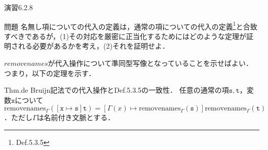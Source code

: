 \documentclass[9pt]{beamer}
\begin{document}
\begin{frame}{演習6.2.8}
\begin{alertblock}{問題}
名無し項についての代入の定義は，通常の項についての代入の定義\footnote{Def.5.3.5}と合致すべきであるが，(1)その対応を厳密に正当化するためにはどのような定理が証明される必要があるかを考え，(2)それを証明せよ．
\end{alertblock}
$removenames$が代入操作について準同型写像となっていることを示せばよい．つまり，以下の定理を示す．\begin{dblock}{Thm.de Bruijn記法での代入操作とDef.5.3.5の一致性．}
任意の通常の項$\mathtt{s, t}$，変数$\mathtt{x}$について$\mathrm{removenames}_{\Gamma}(\mathtt{\left[x\mapsto s\right]t}) = \left[\Gamma(x)\mapsto \mathrm{removenames}_{\Gamma}(\mathtt{s})\right]\mathrm{removenames}_{\Gamma}(\mathtt{t})$．ただし$\Gamma$は名前付き文脈とする．
\end{dblock}
\end{frame}
\end{document}
